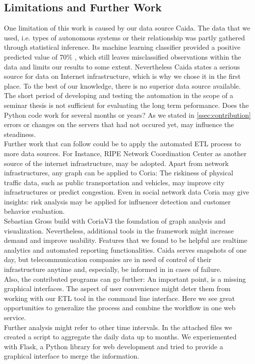 \documentclass[conference, 11pt]{IEEEtran}
\begin{document}
\subsection{Limitations and Further Work}
One limitation of this work is caused by our data source Caida. The data that we used, i.e. types of autonomous systems or their relationship was partly gathered through statistical inference. Its machine learning classifier provided a positive predicted value of 70\% \cite{Classification}, which still leaves misclassified observations within the data and limits our results to some extent. Nevertheless Caida states a serious source for data on Internet infrastructure, which is why we chose it in the first place. To the best of our knowledge, there is no superior data source available.  \\  \linebreak
The short period of developing and testing the automation in the scope of a seminar thesis is not sufficient for evaluating the long term peformance. Does the Python code work for several months or years? As we stated in \ref{ssec:contribution} errors or changes on the servers that had not occured yet, may influence the steadiness. \\

Further work that can follow could be to apply the automated ETL process to more data sources. For Instance, RIPE Network Coordination Center \cite{RipeNCC} as another source of the internet infrastructure, may be adopted. Apart from network infrastructures, any graph can be applied to Coria: The riskiness of physical traffic data, such as public transportation and vehicles, may improve city infrastructures or predict congestion. Even in social network data Coria may give insights: risk analysis may be applied for influencer detection and customer behavior evaluation.\\

Sebastian Gross build with CoriaV3 the foundation of graph analysis and visualization. Nevertheless, additional tools in the framework might increase demand and improve usability. Features that we found to be helpful are realtime analytics and automated reporting functionalities. Caida serves snapshots of one day, but telecommunication companies are in need of control of their infrastructure anytime and, especially, be informed in in cases of failure. \\

Also, the contributed programs can go further: An important point, is a missing graphical interfaces. The aspect of user convenience might deter them from working with our ETL tool in the command line interface. Here we see great opportunities to generalize the process and combine the workflow in one web service.\\ \linebreak 
Further analysis might refer to other time intervals. In the attached files we created a script to aggregate the daily data up to months. 
We experiemented with Flask, a Python library for web development \cite{Flask} and tried to provide a graphical interface to merge the information.
\end{document}
